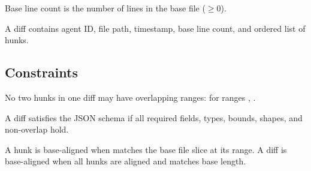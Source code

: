 \begin{definition}\label{def:base-line-count}
Base line count is the number of lines in the base file ($\geq 0$).
\end{definition}

\begin{definition}[Diff]\label{def:diff}
A diff contains agent ID, file path, timestamp, base line count, and ordered list of hunks.
\end{definition}

\subsection{Constraints}

\begin{definition}\label{def:non-overlap}
No two hunks in one diff may have overlapping ranges:  for ranges \code{[a,b)}, \code{[c,d)}.
\end{definition}

\begin{definition}\label{def:schema-validity}
A diff satisfies the JSON schema if all required fields, types, bounds, shapes, and non-overlap hold.
\end{definition}

\begin{definition}\label{def:base-alignment}
A hunk is base-aligned when  matches the base file slice at its range.
A diff is base-aligned when all hunks are aligned and  matches base length.
\end{definition}

